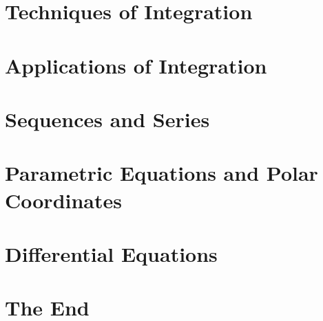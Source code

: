\documentclass[12pt]{article}
\begin{document}
\section{Techniques of Integration}





\section{Applications of Integration}




\section{Sequences and Series}






\section{Parametric Equations and Polar Coordinates}



\section{Differential Equations}





\section*{The End}
\end{document}
